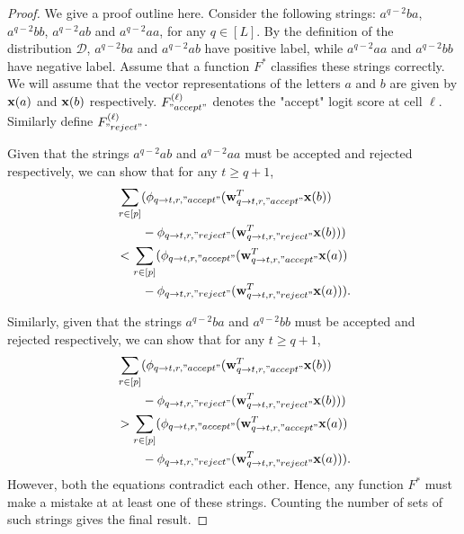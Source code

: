     \begin{proof}
        We give a proof outline here. Consider the following strings: $a^{q-2}ba$, $a^{q-2}bb$, $a^{q-2}ab$ and $a^{q-2}aa$, for any $q \in [L]$. By the definition of the distribution $\mathcal{D}$, $a^{q-2}ba$ and $a^{q-2}ab$ have positive label, while $a^{q-2}aa$ and $a^{q-2}bb$ have negative label. Assume that a function $F^{\ast}$ classifies these strings correctly. We will assume that the vector representations of the letters $a$ and $b$ are given by $\mathbf{x}(a)$ and $\mathbf{x}(b)$ respectively. $F_{"accept"}^{(\ell)}$ denotes the "accept" logit score at cell $\ell$. Similarly define $F_{"reject"}^{(\ell)}$.   
        
        Given that the strings $a^{q-2}ab$ and $a^{q-2}aa$ must be accepted and rejected respectively, we can show that for any $t \ge q + 1$,
        \begin{align*}
        &\sum_{r \in [p]} ( \phi_{q \to t, r, "accept"} (\mathbf{w}_{q \to t, r, "accept"}^T \mathbf{x}(b)) \\& \quad\quad - \phi_{q \to t, r, "reject"} (\mathbf{w}_{q \to t, r, "reject"}^T \mathbf{x}(b))) \\& < \sum_{r \in [p]} ( \phi_{q \to t, r, "accept"} (\mathbf{w}_{q \to t, r, "accept"}^T \mathbf{x}(a)) \\& \quad\quad- \phi_{q \to t, r, "reject"} (\mathbf{w}_{q \to t, r, "reject"}^T \mathbf{x}(a) )).
        \end{align*}
        
        Similarly, given that the strings $a^{q-2}ba$ and $a^{q-2}bb$ must be accepted and rejected respectively, we can show that for any $t \ge q + 1$,       
        \begin{align*}
        &\sum_{r \in [p]}  ( \phi_{q \to t, r, "accept"} (\mathbf{w}_{q \to t, r, "accept"}^T \mathbf{x}(b)) \\& \quad\quad- \phi_{q \to t, r, "reject"} (\mathbf{w}_{q \to t, r, "reject"}^T \mathbf{x}(b)))  \\ & > \sum_{r \in [p]} ( \phi_{q \to t, r, "accept"} (\mathbf{w}_{q \to t, r, "accept"}^T \mathbf{x}(a)) \\& \quad\quad- \phi_{q \to t, r, "reject"} (\mathbf{w}_{q \to t, r, "reject"}^T \mathbf{x}(a))).
        \end{align*}
        However, both the equations contradict each other. Hence, any function $F^{\ast}$ must make a mistake at at least one of these strings. Counting the number of sets of such strings gives the final result.
    \end{proof}
\fi